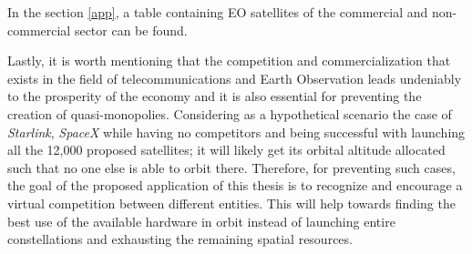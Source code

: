 \begin{center}
\begin{adjustbox}{width=0.9\textwidth}
\begin{tabular}{||c| c |c |c |c||}


\hline
\end{tabular}
\label{table:EO}
\end{adjustbox}
\end{center}
\bigskip

\normalsize

In the section \ref{app}, a table containing EO satellites of the commercial and non-commercial sector can be found.

Lastly, it is worth mentioning that the competition and commercialization that exists in the field of telecommunications and Earth Observation leads undeniably to the prosperity of the economy and it is also essential for preventing the creation of quasi-monopolies. Considering as a hypothetical scenario the case of \textit{Starlink}, \textit{SpaceX} while having no competitors and being successful with launching all the 12,000 proposed satellites; it will likely get its orbital altitude allocated such that no one else is able to orbit there. Therefore, for preventing such cases, the goal of the proposed application of this thesis is to recognize and encourage a virtual competition between different entities. This will help towards finding the best use of the available hardware in orbit instead of launching entire constellations and exhausting the remaining spatial resources.


